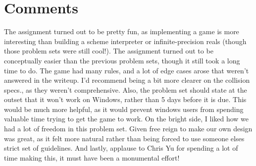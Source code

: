 \documentclass{article}
\begin{document}
\section{Comments}
The assignment turned out to be pretty fun, as implementing a game is more interesting than building a scheme interpreter or infinite-precision reals (though those problem sets were still cool!). The assignment turned out to be conceptually easier than the previous problem sets, though it still took a long time to do. The game had many rules, and a lot of edge cases arose that weren't answered in the writeup. I'd recommend being a bit more clearer on the collision specs., as they weren't comprehensive. Also, the problem set should state at the outset that it won't work on Windows, rather than 5 days before it is due. This would be much more helpful, as it would prevent windows users from spending valuable time trying to get the game to work. On the bright side, I liked how we had a lot of freedom in this problem set. Given free reign to make our own design was great, as it felt more natural rather than being forced to use someone elses strict set of guidelines. And lastly, applause to Chris Yu for spending a lot of time making this, it must have been a monumental effort!
\end{document}

